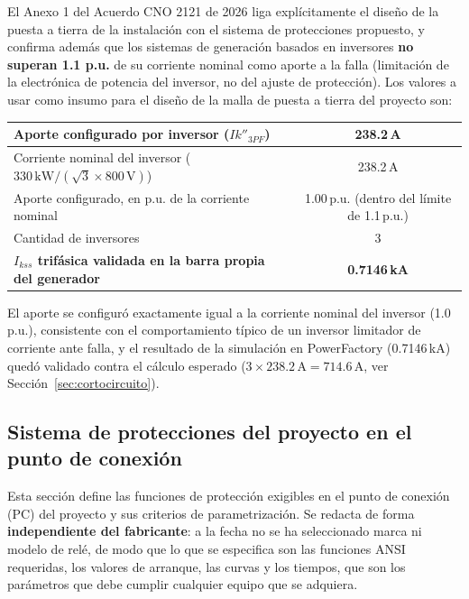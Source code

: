 \documentclass[11pt,a4paper]{article}
\begin{document}
El Anexo 1 del Acuerdo CNO 2121 de 2026 liga expl\'icitamente el dise\~no de la puesta a tierra de la instalaci\'on con el sistema de protecciones propuesto, y confirma adem\'as que los sistemas de generaci\'on basados en inversores \textbf{no superan 1.1 p.u.} de su corriente nominal como aporte a la falla (limitaci\'on de la electr\'onica de potencia del inversor, no del ajuste de protecci\'on). Los valores a usar como insumo para el dise\~no de la malla de puesta a tierra del proyecto son:

\begin{center}
\begin{tabular}{|l|c|}
\hline
Aporte configurado por inversor ($Ik''_{3PF}$) & 238.2\,A \\ \hline
Corriente nominal del inversor ($330\,\text{kW} / (\sqrt{3} \times 800\,\text{V})$) & 238.2\,A \\ \hline
Aporte configurado, en p.u. de la corriente nominal & 1.00\,p.u. (dentro del l\'imite de 1.1\,p.u.) \\ \hline
Cantidad de inversores & 3 \\ \hline
\textbf{$I_{kss}$ trif\'asica validada en la barra propia del generador} & \textbf{0.7146\,kA} \\ \hline
\end{tabular}
\end{center}

El aporte se configur\'o exactamente igual a la corriente nominal del inversor (1.0\,p.u.), consistente con el comportamiento t\'ipico de un inversor limitador de corriente ante falla, y el resultado de la simulaci\'on en PowerFactory (0.7146\,kA) qued\'o validado contra el c\'alculo esperado ($3 \times 238.2\,\text{A} = 714.6\,\text{A}$, ver Secci\'on~\ref{sec:cortocircuito}).

\subsection{Sistema de protecciones del proyecto en el punto de conexi\'on}
\label{sec:protecciones-proyecto}

Esta secci\'on define las funciones de protecci\'on exigibles en el punto de conexi\'on (PC) del proyecto y sus criterios de parametrizaci\'on. Se redacta de forma \textbf{independiente del fabricante}: a la fecha no se ha seleccionado marca ni modelo de rel\'e, de modo que lo que se especifica son las funciones ANSI requeridas, los valores de arranque, las curvas y los tiempos, que son los par\'ametros que debe cumplir cualquier equipo que se adquiera.
\end{document}
